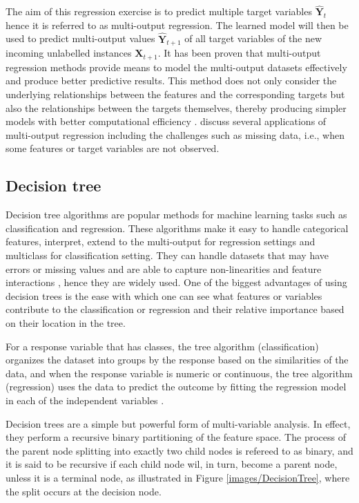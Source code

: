 The aim of this regression exercise is to predict multiple target variables $\widehat{\textbf{Y}}_{t}$  hence it is referred to as multi-output regression. The learned model will then be used to  predict multi-output values $\widehat{\textbf{Y}}_{t+1}$  of all target variables of the new incoming unlabelled instances $\textbf{X}_{t+1}$. It has been proven that multi-output regression methods provide means to model the multi-output datasets effectively and produce better predictive results. This method does not only consider  the underlying relationships
between the features and the corresponding targets but also the relationships between
the targets themselves, thereby producing simpler models with better computational efficiency \citep{borchani2015survey}. \citep{borchani2015survey} discuss several applications of multi-output regression including the challenges such as missing data, i.e., when some features or target variables are not observed.

\subsection{Decision tree}
\label{Dt}
Decision tree algorithms are popular methods for machine learning tasks such as classification and regression. These algorithms make it easy to handle categorical features, interpret, extend to the multi-output for regression settings and multiclass for classification setting. They can handle datasets that may have errors or missing values and are able to capture non-linearities and feature interactions \citep{DT}, hence they are widely used. One of the biggest advantages of using decision trees is the ease with which one can see what features or variables contribute to the classification or regression and their relative importance based on their location in the tree.

For a response variable that
has classes, the tree algorithm (classification) organizes the dataset into groups by the response based on the similarities of the data, and when the response variable is numeric or continuous, the tree algorithm (regression) uses the data to predict the outcome by fitting the regression model in each of the independent variables \citep{morgan2014classification}.

Decision trees are a simple but powerful form of multi-variable analysis. In effect, they  perform a recursive binary partitioning of the feature space. The process of the parent node splitting into exactly two child nodes is refereed to as binary\citep{moisen2008classification}, and it is said to be recursive if each child node wil, in turn, become a parent node, unless it is a terminal node, as illustrated in Figure \ref{images/DecisionTree}, where the split occurs at the decision node.  

